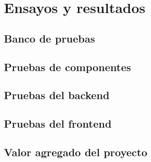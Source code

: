 \chapter{Ensayos y resultados} %


\section{Banco de pruebas}


\section{Pruebas de componentes}


\section{Pruebas del backend}


\section{Pruebas del frontend}


\section{Valor agregado del proyecto}

